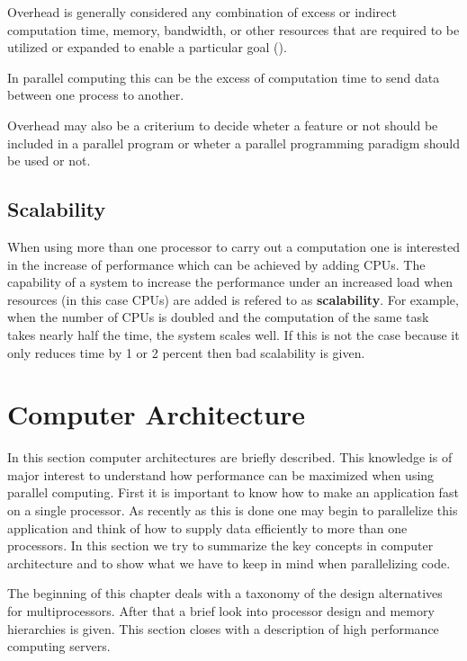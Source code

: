 Overhead is generally considered any combination of excess or indirect
computation time, memory, bandwidth, or other
resources that are required to be utilized or expanded to enable a
particular goal (\cite{wiki:overhead}).

In parallel computing this can be the excess of computation time to
send data between one process to another.

Overhead may also be a criterium to decide wheter a feature or not
should be included in a parallel program or wheter a parallel
programming paradigm should be used or not.

\subsection{Scalability}

When using more than one processor to carry out a computation one is
interested in the increase of performance which can be achieved by
adding CPUs. The capability of a system to increase the performance
under an increased load when resources (in this case CPUs) are added
is refered to as \textbf{scalability}. For example, when the number of
CPUs is doubled and the computation of the same task takes nearly half
the time, the 
system scales well. If this is not the case because it only reduces
time by 1 or 2 percent then bad scalability is given. 

\section{Computer Architecture}

In this section computer architectures are briefly described. This
knowledge is of major interest to
understand how performance can be maximized when using parallel
computing. First it is important to know how to make an application fast
on a single processor. As recently as this is done one may begin to
parallelize this application and think of how to supply data efficiently to
more than one processors. In this section we try to summarize the key
concepts in computer architecture and to show what we have to keep in
mind when parallelizing code.

The beginning of this chapter deals with a taxonomy of
the design alternatives for multiprocessors. After that a brief look
into processor design and memory hierarchies is given. This section
closes with a description of high performance computing servers.

